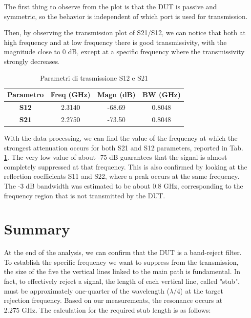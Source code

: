 The first thing to observe from the plot is that the DUT is passive and symmetric, so the behavior is independent of which port is used for transmission. 

Then, by observing the transmission plot of S21/S12, we can notice that both at high frequency and at low frequency there is good transmissivity, with the magnitude close to 0 dB, except at a specific frequency where the transmissivity strongly decreases.

\begin{table}[ht]
\centering
\begin{tabular}{|c|c|c|c|}
\hline
\textbf{Parametro} & \textbf{Freq (GHz)} & \textbf{Magn (dB)} & \textbf{BW (GHz)} \\ \hline
\textbf{S12}       & 2.3140              & -68.69                 & 0.8048            \\ \hline
\textbf{S21}       & 2.2750              & -73.50                 & 0.8048            \\ \hline
\end{tabular}
\caption{Parametri di trasmissione S12 e S21}
\label{tab:parametri_s}
\end{table}

With the data processing, we can find the value of the frequency at which the strongest attenuation occurs for both S21 and S12 parameters, reported in Tab. \ref{tab:parametri_s}. The very low value of about -75 dB guarantees that the signal is almost completely suppressed at that frequency. This is also confirmed by looking at the reflection coefficients S11 and S22, where a peak occurs at the same frequency.
The -3 dB bandwidth was estimated to be about 0.8 GHz, corresponding to the frequency region that is not transmitted by the DUT. 

\section{Summary}
At the end of the analysis, we can confirm that the DUT is a band-reject filter. To establish the specific frequency we want to suppress from the transmission, the size of the five the vertical lines linked to the main path is fundamental. In fact, to effectively reject a signal, the length of each vertical line, called "stub", must be approximately one-quarter of the wavelength ($\lambda/4$) at the target rejection frequency. Based on our measurements, the resonance occurs at $2.275 \text{ GHz}$. The calculation for the required stub length is as follows:

